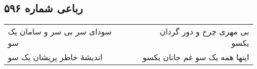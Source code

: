 \begin{center}
\section*{رباعی شماره ۵۹۶}
\label{sec:sh596}
\begin{longtable}{l p{0.5cm} r}
سودای سر بی سر و سامان یک سو
&&
بی مهری چرخ و دور گردان یکسو
\\
اندیشهٔ خاطر پریشان یک سو
&&
اینها همه یک سو غم جانان یکسو
\\
\end{longtable}
\end{center}
